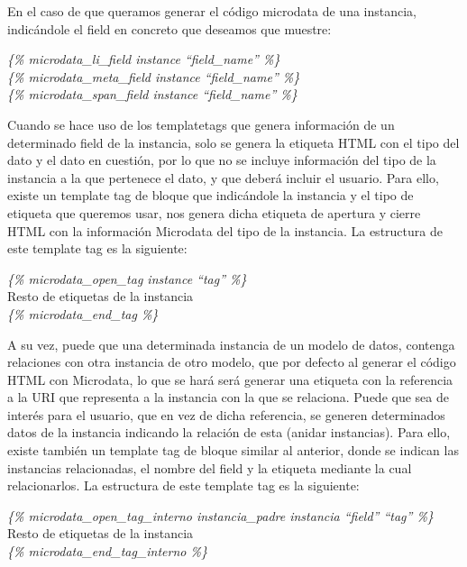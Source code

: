 En el caso de que queramos generar el código microdata de una instancia,
indicándole el field en concreto que deseamos que muestre:
\begin{center}
    \textit{\{\% microdata\_li\_field instance ``field\_name'' \%\}}\\
    \textit{\{\% microdata\_meta\_field instance ``field\_name'' \%\}}\\
    \textit{\{\% microdata\_span\_field instance ``field\_name'' \%\}}\\
\end{center}

Cuando se hace uso de los templatetags que genera información de un determinado
field de la instancia, solo se genera la etiqueta HTML con el tipo del dato y el
dato en cuestión, por lo que no se incluye información del tipo de la instancia
a la que pertenece el dato, y que deberá incluir el usuario. Para ello, existe
un template tag de bloque que indicándole la instancia y el tipo de etiqueta que
queremos usar, nos genera dicha etiqueta de apertura y cierre HTML con la
información Microdata del tipo de la instancia. La estructura de este template
tag es la siguiente:
\begin{center}
    \textit{\{\% microdata\_open\_tag instance ``tag'' \%\}}\\
    Resto de etiquetas de la instancia\\
    \textit{\{\% microdata\_end\_tag \%\}}\\
\end{center}

A su vez, puede que una determinada instancia de un modelo de datos, contenga
relaciones con otra instancia de otro modelo, que por defecto al generar el
código HTML con Microdata, lo que se hará será generar una etiqueta con la
referencia a la URI que representa a la instancia con la que se relaciona. Puede
que sea de interés para el usuario, que en vez de dicha referencia, se generen
determinados datos de la instancia indicando la relación de esta (anidar
instancias). Para ello, existe también un template tag de bloque similar al
anterior, donde se indican las instancias relacionadas, el nombre del field y la
etiqueta mediante la cual relacionarlos. La estructura de este template tag es
la siguiente:
\begin{center}
    \textit{\{\% microdata\_open\_tag\_interno instancia\_padre instancia ``field'' ``tag'' \%\}}\\
    Resto de etiquetas de la instancia\\
    \textit{\{\% microdata\_end\_tag\_interno \%\}}\\
\end{center}

